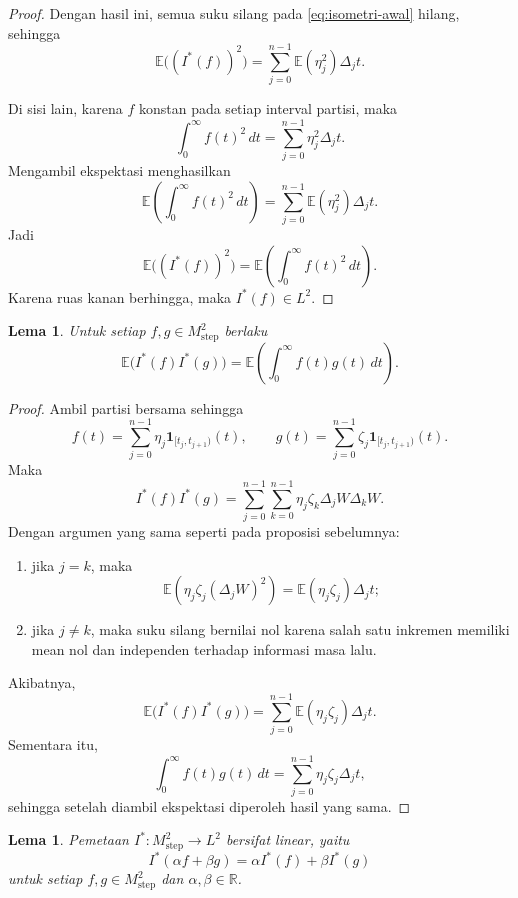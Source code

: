 \documentclass[12pt,a4paper]{article}
\theoremstyle{definition}
\theoremstyle{plain}
\newtheorem{lema}[definisi]{Lema}
\newcommand{\E}{\mathbb{E}}
\newcommand{\R}{\mathbb{R}}
\newcommand{\ind}{\mathbf{1}}
\begin{document}
\begin{proof}
  Dengan hasil ini, semua suku silang pada \eqref{eq:isometri-awal} hilang,
  sehingga
  \[
    \E\bigl((I^\ast(f))^2\bigr)
    =
    \sum_{j=0}^{n-1}\E(\eta_j^2)\Delta_jt.
  \]

  Di sisi lain, karena $f$ konstan pada setiap interval partisi, maka
  \[
    \int_0^\infty f(t)^2\,dt
    =
    \sum_{j=0}^{n-1}\eta_j^2\Delta_jt.
  \]
  Mengambil ekspektasi menghasilkan
  \[
    \E\left(\int_0^\infty f(t)^2\,dt\right)
    =
    \sum_{j=0}^{n-1}\E(\eta_j^2)\Delta_jt.
  \]
  Jadi
  \[
    \E\bigl((I^\ast(f))^2\bigr)
    =
    \E\left(\int_0^\infty f(t)^2\,dt\right).
  \]
  Karena ruas kanan berhingga, maka $I^\ast(f)\in L^2$.
\end{proof}

\begin{lema}
  Untuk setiap $f,g\in M_{\mathrm{step}}^2$ berlaku
  \[
    \E\bigl(I^\ast(f)I^\ast(g)\bigr)
    =
    \E\left(\int_0^\infty f(t)g(t)\,dt\right).
  \]
\end{lema}

\begin{proof}
  Ambil partisi bersama sehingga
  \[
    f(t)=\sum_{j=0}^{n-1}\eta_j\ind_{[t_j,t_{j+1})}(t),
    \qquad
    g(t)=\sum_{j=0}^{n-1}\zeta_j\ind_{[t_j,t_{j+1})}(t).
  \]
  Maka
  \[
    I^\ast(f)I^\ast(g)
    =
    \sum_{j=0}^{n-1}\sum_{k=0}^{n-1}\eta_j\zeta_k\Delta_jW\Delta_kW.
  \]
  Dengan argumen yang sama seperti pada proposisi sebelumnya:
  \begin{enumerate}[label=\arabic*.]
    \item jika $j=k$, maka
          \[
            \E(\eta_j\zeta_j(\Delta_jW)^2)=\E(\eta_j\zeta_j)\Delta_jt;
          \]
    \item jika $j\ne k$, maka suku silang bernilai nol karena salah satu
          inkremen memiliki mean nol dan independen terhadap informasi masa lalu.
  \end{enumerate}
  Akibatnya,
  \[
    \E\bigl(I^\ast(f)I^\ast(g)\bigr)
    =
    \sum_{j=0}^{n-1}\E(\eta_j\zeta_j)\Delta_jt.
  \]
  Sementara itu,
  \[
    \int_0^\infty f(t)g(t)\,dt
    =
    \sum_{j=0}^{n-1}\eta_j\zeta_j\Delta_jt,
  \]
  sehingga setelah diambil ekspektasi diperoleh hasil yang sama.
\end{proof}

\begin{lema}
  Pemetaan $I^\ast:M_{\mathrm{step}}^2\to L^2$ bersifat linear, yaitu
  \[
    I^\ast(\alpha f+\beta g)=\alpha I^\ast(f)+\beta I^\ast(g)
  \]
  untuk setiap $f,g\in M_{\mathrm{step}}^2$ dan $\alpha,\beta\in\R$.
\end{lema}
\end{document}
